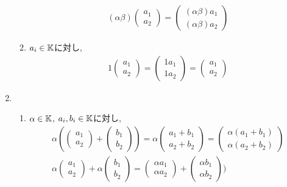 \begin{example}
\begin{enumerate}
\begin{enumerate}
\begin{align*}
    (\alpha\beta)\begin{pmatrix}a_1\\a_2\end{pmatrix}
    =\begin{pmatrix}(\alpha\beta) a_1\\(\alpha\beta) a_2\end{pmatrix}
\end{align*}
\item
$a_i\in\mathbb{K}$に対し,
    \begin{align*}
    1\begin{pmatrix}a_1\\a_2\end{pmatrix}
    =\begin{pmatrix}1 a_1\\1 a_2\end{pmatrix}
    =\begin{pmatrix}a_1\\a_2\end{pmatrix}
    \end{align*}
    \end{enumerate}
  \item
    \begin{enumerate}
    \item
$\alpha\in \mathbb{K}$, $a_i,b_i\in\mathbb{K}$に対し,
    \begin{align*}
\alpha(\begin{pmatrix}a_1\\a_2\end{pmatrix}+\begin{pmatrix}b_1\\b_2\end{pmatrix})
=\alpha\begin{pmatrix}a_1+b_1\\a_2+b_2\end{pmatrix}
=\begin{pmatrix}\alpha(a_1+b_1)\\\alpha(a_2+b_2)\end{pmatrix}\\
\alpha\begin{pmatrix}a_1\\a_2\end{pmatrix}+\alpha\begin{pmatrix}b_1\\b_2\end{pmatrix}
=\begin{pmatrix}\alpha a_1\\\alpha a_2\end{pmatrix}+\begin{pmatrix}\alpha b_1\\\alpha b_2\end{pmatrix})

\end{align*}
\end{enumerate}
\end{enumerate}
\end{example}
